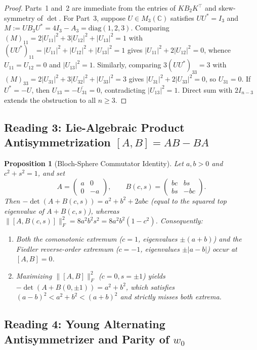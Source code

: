 \documentclass[11pt,a4paper]{article}
\theoremstyle{plain}
\newtheorem{proposition}[theorem]{Proposition}
\theoremstyle{definition}
\newcommand{\C}{\mathbb{C}}
\newcommand{\diag}{\mathrm{diag}}
\begin{document}
\begin{proof}
Parts~1 and~2 are immediate from the entries of $K B_2 K^\top$ and skew-symmetry of $\det$. For Part~3, suppose $U \in M_3(\C)$ satisfies $U U^* = I_3$ and $M := U B_3 U^* = 4 I_3 - A_3 = \diag(1, 2, 3)$. Comparing $(M)_{11} = 2|U_{11}|^2 + 3|U_{12}|^2 + |U_{13}|^2 = 1$ with $(U U^*)_{11} = |U_{11}|^2 + |U_{12}|^2 + |U_{13}|^2 = 1$ gives $|U_{11}|^2 + 2|U_{12}|^2 = 0$, whence $U_{11} = U_{12} = 0$ and $|U_{13}|^2 = 1$. Similarly, comparing $3(U U^*)_{33} = 3$ with $(M)_{33} = 2|U_{31}|^2 + 3|U_{32}|^2 + |U_{33}|^2 = 3$ gives $|U_{31}|^2 + 2|U_{33}|^2 = 0$, so $U_{31} = 0$. If $U^* = -U$, then $U_{13} = -\overline{U_{31}} = 0$, contradicting $|U_{13}|^2 = 1$. Direct sum with $2 I_{n-3}$ extends the obstruction to all $n \ge 3$.
\end{proof}

\subsection{Reading 3: Lie-Algebraic Product Antisymmetrization $[A, B] = A B - B A$}

\begin{proposition}[Bloch-Sphere Commutator Identity]\label{prop:refute3}
Let $a, b > 0$ and $c^2 + s^2 = 1$, and set
\[
  A = \begin{pmatrix} a & 0 \\ 0 & -a \end{pmatrix}, \qquad
  B(c, s) = \begin{pmatrix} b c & b s \\ b s & -b c \end{pmatrix}.
\]
Then $-\det(A + B(c, s)) = a^2 + b^2 + 2 a b c$ (equal to the squared top eigenvalue of $A + B(c,s)$), whereas $\|[A, B(c, s)]\|_F^2 = 8 a^2 b^2 s^2 = 8 a^2 b^2 (1 - c^2)$. Consequently:
\begin{enumerate}
  \item Both the comonotonic extremum ($c = 1$, eigenvalues $\pm(a+b)$) and the Fiedler reverse-order extremum ($c = -1$, eigenvalues $\pm|a-b|$) occur at $[A, B] = 0$.
  \item Maximizing $\|[A, B]\|_F^2$ ($c = 0, s = \pm 1$) yields $-\det(A + B(0, \pm 1)) = a^2 + b^2$, which satisfies $(a - b)^2 < a^2 + b^2 < (a + b)^2$ and strictly misses both extrema.
\end{enumerate}
\end{proposition}

\subsection{Reading 4: Young Alternating Antisymmetrizer and Parity of $w_0$}
\end{document}
